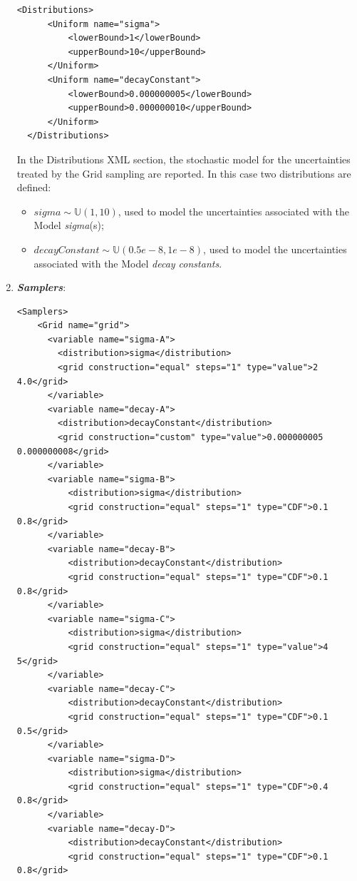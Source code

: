 \begin{enumerate}
\begin{lstlisting}[style=XML,morekeywords={arg,extension,pauseAtEnd,overwrite}]
  <Distributions>
      <Uniform name="sigma">
          <lowerBound>1</lowerBound>
          <upperBound>10</upperBound>
      </Uniform>
      <Uniform name="decayConstant">
          <lowerBound>0.000000005</lowerBound>
          <upperBound>0.000000010</upperBound>
      </Uniform>
  </Distributions>   
\end{lstlisting}
  In the Distributions XML section, the stochastic model for the 
  uncertainties  treated by the Grid sampling are reported. In 
  this case two distributions are defined: 
  \begin{itemize}
    \item $sigma \sim \mathbb{U}(1,10)$, used to model the uncertainties 
    associated with  the Model \textit{sigma}(s);
    \item  $decayConstant \sim \mathbb{U}(0.5e-8,1e-8)$,  used to 
    model the uncertainties 
    associated with  the Model \textit{decay constants}.
  \end{itemize}
   \item \textbf{\textit{Samplers}}:
\begin{lstlisting}[style=XML,morekeywords={arg,extension,pauseAtEnd,overwrite}]
  <Samplers>
    <Grid name="grid">
      <variable name="sigma-A">
        <distribution>sigma</distribution>
        <grid construction="equal" steps="1" type="value">2 4.0</grid>
      </variable>
      <variable name="decay-A">
        <distribution>decayConstant</distribution>
        <grid construction="custom" type="value">0.000000005  0.000000008</grid>
      </variable>
      <variable name="sigma-B">
          <distribution>sigma</distribution>
          <grid construction="equal" steps="1" type="CDF">0.1 0.8</grid>
      </variable>
      <variable name="decay-B">
          <distribution>decayConstant</distribution>
          <grid construction="equal" steps="1" type="CDF">0.1 0.8</grid>
      </variable>
      <variable name="sigma-C">
          <distribution>sigma</distribution>
          <grid construction="equal" steps="1" type="value">4 5</grid>
      </variable>
      <variable name="decay-C">
          <distribution>decayConstant</distribution>
          <grid construction="equal" steps="1" type="CDF">0.1 0.5</grid>
      </variable>
      <variable name="sigma-D">
          <distribution>sigma</distribution>
          <grid construction="equal" steps="1" type="CDF">0.4 0.8</grid>
      </variable>
      <variable name="decay-D">
          <distribution>decayConstant</distribution>
          <grid construction="equal" steps="1" type="CDF">0.1 0.8</grid>

\end{lstlisting}
\end{enumerate}
